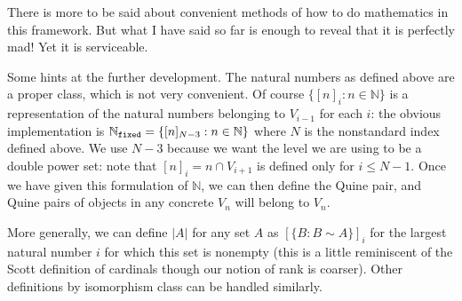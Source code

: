 \documentclass[12pt]{article}
\begin{document}
There is more to be said about convenient methods of how to do mathematics in this framework.  But what I have said so far is enough to reveal that it is perfectly mad!  Yet it is serviceable.

Some hints at the further development.  The natural numbers as defined above are a proper class, which is not very convenient.  Of course $\{[n]_i:n \in \mathbb N\}$ is a representation of the natural numbers belonging to $V_{i-1}$ for each $i$:  the obvious implementation is $\mathbb N_{\tt fixed} =\{[n]_{N-3}:n \in \mathbb N\}$ where $N$ is the nonstandard index defined above.  We use $N-3$ because we want the level we are using to be a  double power set:  note that $[n]_i=n \cap V_{i+1}$ is defined only for $i \leq N-1$. Once we have given this formulation of $\mathbb N$, we can then define the Quine pair, and Quine pairs of objects in any concrete $V_n$ will belong to $V_n$.

More generally, we can define $|A|$ for any set $A$ as $[\{B:B \sim A\}]_i$ for the largest natural number $i$ for which this set is nonempty (this is a little reminiscent of the Scott definition of cardinals though our notion of rank is coarser).  Other definitions by isomorphism class can be handled similarly.
\end{document}
